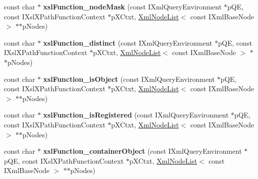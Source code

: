 \begin{DoxyCompactItemize}
\item 
\hypertarget{group__XSLModule-Functions_ga45adf92cb3980e9f99981cb75d4a085e}{const char $\ast$ {\bfseries xsl\-Function\-\_\-node\-Mask} (const \-I\-Xml\-Query\-Environment $\ast$p\-Q\-E, const \-I\-Xsl\-X\-Path\-Function\-Context $\ast$p\-X\-Ctxt, \hyperlink{classgeneral__server_1_1XmlNodeList}{\-Xml\-Node\-List}$<$ const \-I\-Xml\-Base\-Node $>$ $\ast$$\ast$p\-Nodes)}\label{group__XSLModule-Functions_ga45adf92cb3980e9f99981cb75d4a085e}

\item 
\hypertarget{group__XSLModule-Functions_gae3716816906dd36bf22342299cdb03ae}{const char $\ast$ {\bfseries xsl\-Function\-\_\-distinct} (const \-I\-Xml\-Query\-Environment $\ast$p\-Q\-E, const \-I\-Xsl\-X\-Path\-Function\-Context $\ast$p\-X\-Ctxt, \hyperlink{classgeneral__server_1_1XmlNodeList}{\-Xml\-Node\-List}$<$ const \-I\-Xml\-Base\-Node $>$ $\ast$$\ast$p\-Nodes)}\label{group__XSLModule-Functions_gae3716816906dd36bf22342299cdb03ae}

\item 
\hypertarget{group__XSLModule-Functions_ga2548a4a3404cb2095c2489550b0f7023}{const char $\ast$ {\bfseries xsl\-Function\-\_\-is\-Object} (const \-I\-Xml\-Query\-Environment $\ast$p\-Q\-E, const \-I\-Xsl\-X\-Path\-Function\-Context $\ast$p\-X\-Ctxt, \hyperlink{classgeneral__server_1_1XmlNodeList}{\-Xml\-Node\-List}$<$ const \-I\-Xml\-Base\-Node $>$ $\ast$$\ast$p\-Nodes)}\label{group__XSLModule-Functions_ga2548a4a3404cb2095c2489550b0f7023}

\item 
\hypertarget{group__XSLModule-Functions_gab293bbff4f5db47161867047cf1b11ec}{const char $\ast$ {\bfseries xsl\-Function\-\_\-is\-Registered} (const \-I\-Xml\-Query\-Environment $\ast$p\-Q\-E, const \-I\-Xsl\-X\-Path\-Function\-Context $\ast$p\-X\-Ctxt, \hyperlink{classgeneral__server_1_1XmlNodeList}{\-Xml\-Node\-List}$<$ const \-I\-Xml\-Base\-Node $>$ $\ast$$\ast$p\-Nodes)}\label{group__XSLModule-Functions_gab293bbff4f5db47161867047cf1b11ec}

\item 
\hypertarget{group__XSLModule-Functions_ga59fe6ab8210a3e16958ead0d29c44a18}{const char $\ast$ {\bfseries xsl\-Function\-\_\-container\-Object} (const \-I\-Xml\-Query\-Environment $\ast$p\-Q\-E, const \-I\-Xsl\-X\-Path\-Function\-Context $\ast$p\-X\-Ctxt, \hyperlink{classgeneral__server_1_1XmlNodeList}{\-Xml\-Node\-List}$<$ const \-I\-Xml\-Base\-Node $>$ $\ast$$\ast$p\-Nodes)}\label{group__XSLModule-Functions_ga59fe6ab8210a3e16958ead0d29c44a18}


\end{DoxyCompactItemize}
